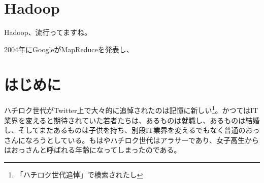\section{Hadoop}

Hadoop、流行ってますね。

2004年にGoogleがMapReduceを発表し、

\section{はじめに}

\lettrine{ハ}
チロク世代がTwitter上で大々的に追悼されたのは記憶に新しい\footnote{「ハチロク世代追悼」で検索されたし}。かつてはIT業界を変えると期待されていた若者たちは、あるものは就職し、あるものは結婚し、そしてまたあるものは子供を持ち、別段IT業界を変えるでもなく普通のおっさんになろうとしている。もはやハチロク世代はアラサーであり、女子高生からはおっさんと呼ばれる年齢になってしまったのである。


